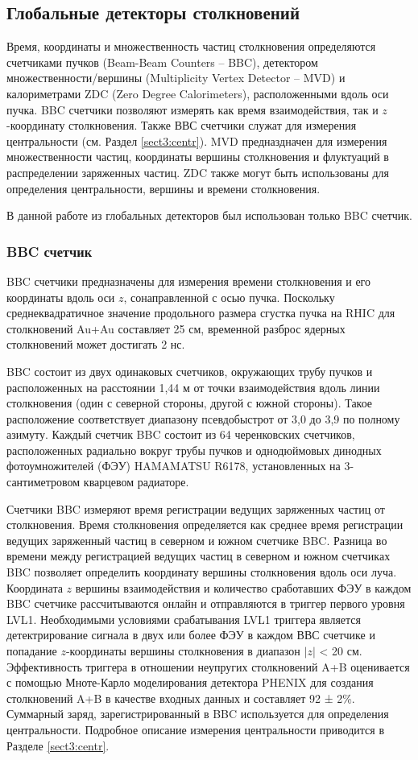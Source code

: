 \subsection{Глобальные детекторы столкновений}
Время, координаты и множественность частиц столкновения определяются счетчиками пучков (Beam-Beam Counters -- BBC), детектором множественности/вершины (Multiplicity Vertex Detector -- MVD) и калориметрами ZDC (Zero Degree Calorimeters), расположенными вдоль оси пучка. BBC счетчики позволяют измерять как время взаимодействия, так и $z$-координату столкновения. Также ВВС счетчики служат для измерения центральности (см. Раздел \ref{sect3:centr}). MVD предназдначен для измерения множественности частиц, координаты вершины столкновения и флуктуаций в распределении заряженных частиц. ZDC также могут быть использованы для определения центральности, вершины и времени столкновения.

В данной работе из глобальных детекторов был использован только BBC счетчик.

\subsubsection{BBC счетчик}
BBC счетчики предназначены для измерения времени столкновения и его координаты вдоль оси $z$, сонаправленной с осью пучка. Поскольку среднеквадратичное значение продольного размера сгустка пучка на RHIC для столкновений Au+Au составляет 25 см, временной разброс ядерных столкновений может достигать 2 нс.

BBC состоит из двух одинаковых счетчиков, окружающих трубу пучков и расположенных на расстоянии 1,44 м от точки взаимодействия вдоль линии столкновения (один с северной стороны, другой с южной стороны). Такое расположение соответствует диапазону псевдобыстрот от 3,0 до 3,9 по полному азимуту. Каждый счетчик BBC состоит из 64 черенковских счетчиков, расположенных радиально вокруг трубы пучков и однодюймовых динодных фотоумножителей (ФЭУ) HAMAMATSU R6178, установленных на 3-сантиметровом кварцевом радиаторе.

Счетчики BBC измеряют время регистрации ведущих заряженных частиц от столкновения. Время столкновения определяется как среднее время регистрации ведущих заряженный частиц в северном и южном счетчике BBC. 
Разница во времени между регистрацией ведущих частиц в северном и южном счетчиках BBC позволяет определить координату вершины столкновения вдоль оси луча. Координата $z$ вершины взаимодействия и количество сработавших ФЭУ в каждом BBC счетчике рассчитываются онлайн и отправляются в триггер первого уровня LVL1. Необходимыми условиями срабатывания LVL1 триггера является детектрирование сигнала в двух или более ФЭУ в каждом ВВС счетчике и попадание $z$-координаты вершины столкновения в диапазон $|z|$ < 20 см.  Эффективность триггера в отношении неупругих столкновений A+B оценивается с помощью Мноте-Карло моделирования детектора PHENIX для создания столкновений A+B в качестве входных данных и составляет 92 ± 2\%. Суммарный заряд, зарегистрированный в BBC используется для определения центральности. Подробное описание измерения центральности приводится в Разделе \ref{sect3:centr}.


